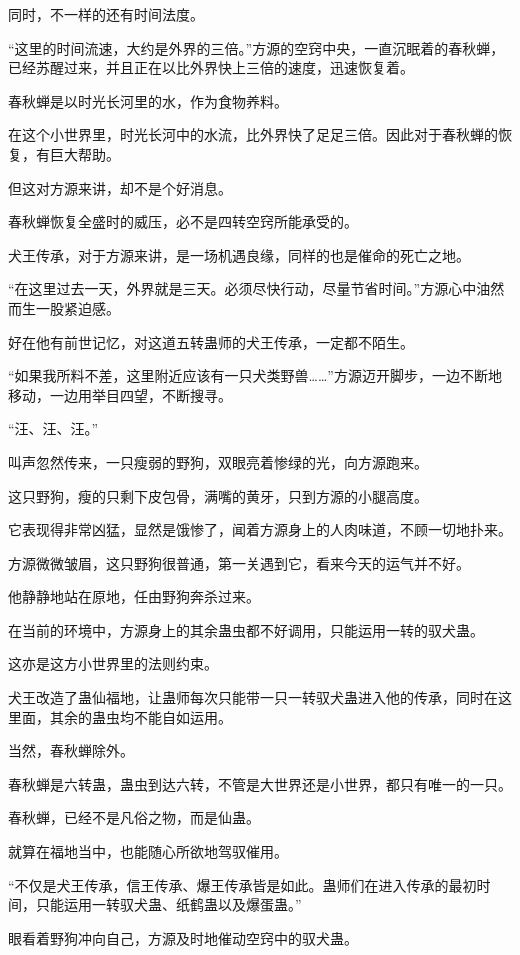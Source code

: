 \begin{this_body}
同时，不一样的还有时间法度。

“这里的时间流速，大约是外界的三倍。”方源的空窍中央，一直沉眠着的春秋蝉，已经苏醒过来，并且正在以比外界快上三倍的速度，迅速恢复着。

春秋蝉是以时光长河里的水，作为食物养料。

在这个小世界里，时光长河中的水流，比外界快了足足三倍。因此对于春秋蝉的恢复，有巨大帮助。

但这对方源来讲，却不是个好消息。

春秋蝉恢复全盛时的威压，必不是四转空窍所能承受的。

犬王传承，对于方源来讲，是一场机遇良缘，同样的也是催命的死亡之地。

“在这里过去一天，外界就是三天。必须尽快行动，尽量节省时间。”方源心中油然而生一股紧迫感。

好在他有前世记忆，对这道五转蛊师的犬王传承，一定都不陌生。

“如果我所料不差，这里附近应该有一只犬类野兽……”方源迈开脚步，一边不断地移动，一边用举目四望，不断搜寻。

“汪、汪、汪。”

叫声忽然传来，一只瘦弱的野狗，双眼亮着惨绿的光，向方源跑来。

这只野狗，瘦的只剩下皮包骨，满嘴的黄牙，只到方源的小腿高度。

它表现得非常凶猛，显然是饿惨了，闻着方源身上的人肉味道，不顾一切地扑来。

方源微微皱眉，这只野狗很普通，第一关遇到它，看来今天的运气并不好。

他静静地站在原地，任由野狗奔杀过来。

在当前的环境中，方源身上的其余蛊虫都不好调用，只能运用一转的驭犬蛊。

这亦是这方小世界里的法则约束。

犬王改造了蛊仙福地，让蛊师每次只能带一只一转驭犬蛊进入他的传承，同时在这里面，其余的蛊虫均不能自如运用。

当然，春秋蝉除外。

春秋蝉是六转蛊，蛊虫到达六转，不管是大世界还是小世界，都只有唯一的一只。

春秋蝉，已经不是凡俗之物，而是仙蛊。

就算在福地当中，也能随心所欲地驾驭催用。

“不仅是犬王传承，信王传承、爆王传承皆是如此。蛊师们在进入传承的最初时间，只能运用一转驭犬蛊、纸鹤蛊以及爆蛋蛊。”

眼看着野狗冲向自己，方源及时地催动空窍中的驭犬蛊。


\end{this_body}
